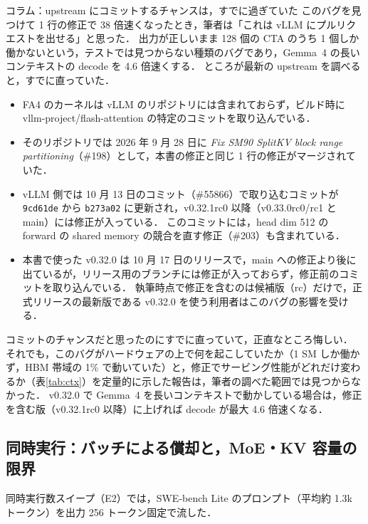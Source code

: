 \begin{keybox}{コラム：upstream にコミットするチャンスは，すでに過ぎていた}
このバグを見つけて 1 行の修正で 38 倍速くなったとき，筆者は「これは vLLM にプルリクエストを出せる」と思った．
出力が正しいまま 128 個の CTA のうち 1 個しか働かないという，テストでは見つからない種類のバグであり，Gemma~4 の長いコンテキストの decode を 4.6 倍速くする．
ところが最新の upstream を調べると，すでに直っていた．

\begin{itemize}
\item FA4 のカーネルは vLLM のリポジトリには含まれておらず，ビルド時に vllm-project/flash-attention の特定のコミットを取り込んでいる．
\item そのリポジトリでは 2026 年 9 月 28 日に \textit{Fix SM90 SplitKV block range partitioning}（\#198）として，本書の修正と同じ 1 行の修正がマージされていた．
\item vLLM 側では 10 月 13 日のコミット（\#55866）で取り込むコミットが \texttt{9cd61de} から \texttt{b273a02} に更新され，v0.32.1rc0 以降（v0.33.0rc0/rc1 と main）には修正が入っている．
      このコミットには，head dim 512 の forward の shared memory の競合を直す修正（\#203）も含まれている．
\item 本書で使った v0.32.0 は 10 月 17 日のリリースで，main への修正より後に出ているが，リリース用のブランチには修正が入っておらず，修正前のコミットを取り込んでいる．
      執筆時点で修正を含むのは候補版（rc）だけで，正式リリースの最新版である v0.32.0 を使う利用者はこのバグの影響を受ける．
\end{itemize}

コミットのチャンスだと思ったのにすでに直っていて，正直なところ悔しい．
それでも，このバグがハードウェアの上で何を起こしていたか（1 SM しか働かず，HBM 帯域の 1\% で動いていた）と，修正でサービング性能がどれだけ変わるか（表\ref{tab:ctx}）を定量的に示した報告は，筆者の調べた範囲では見つからなかった．
v0.32.0 で Gemma~4 を長いコンテキストで動かしている場合は，修正を含む版（v0.32.1rc0 以降）に上げれば decode が最大 4.6 倍速くなる．
\end{keybox}

\subsection{同時実行：バッチによる償却と，MoE・KV 容量の限界}
\label{sec:conc}
同時実行数スイープ（E2）では，SWE-bench Lite のプロンプト（平均約 1.3k トークン）を出力 256 トークン固定で流した．

